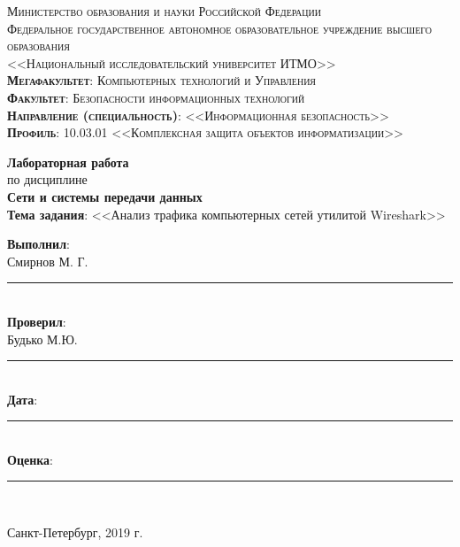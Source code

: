 \begin{titlepage}
	\begin{center}
		\textsc{
			\fontsize{12pt}{14pt}\selectfont
			Министерство образования и науки Российской Федерации\\
Федеральное государственное автономное образовательное учреждение высшего образования\\
<<Национальный исследовательский университет ИТМО>>\\
	\textbf{Мегафакультет}:  Компьютерных технологий и Управления\\
			\textbf{Факультет}: Безопасности информационных технологий\\
			\textbf{Направление (специальность)}: <<Информационная безопасность>>\\
			\textbf{Профиль}: 10.03.01 <<Комплексная защита объектов информатизации>>}
		
		\vfill
		
		\textbf{Лабораторная работа}\\
		по дисциплине\\
		\textbf{Сети и системы передачи данных}\\
	\vfill
	\textbf{Тема задания}: <<Анализ трафика компьютерных сетей утилитой Wireshark>>\\
	\end{center}

	\vfill
	
	\begin{flushright}
	\textbf{Выполнил}:\\ Смирнов М. Г. \rule{5em}{.1pt}\\
	\textbf{Проверил}:\\ Будько М.Ю.\rule{5em}{.1pt}\\
		\vfill
	\textbf{Дата}: \rule{10em}{.1pt}\\
	\textbf{Оценка}: \rule{10em}{.1pt}\\

	\vfill
	


	\end{flushright}
	\vfill
	\begin{center}
		Санкт-Петербург, 2019 г.
	\end{center}
\end{titlepage}